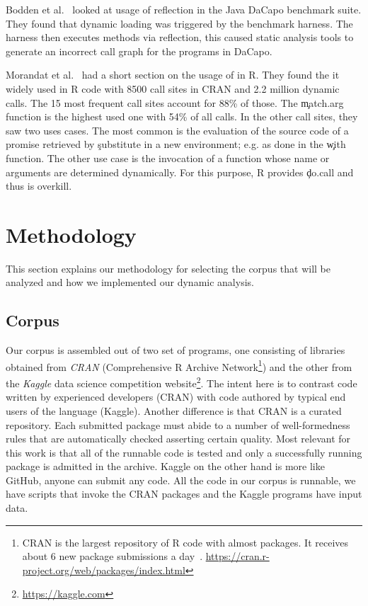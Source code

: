 \documentclass[acmsmall]{acmart}
\begin{document}
Bodden et al.~\cite{bodden} looked at usage of reflection in the Java
DaCapo benchmark suite. They found that dynamic loading was triggered
by the benchmark harness. The harness then executes methods via
reflection, this caused static analysis tools to generate an incorrect
call graph for the programs in DaCapo.

Morandat et al.~\cite{ecoop12} had a short section on the usage of
\eval in R. They found the it widely used in R code with 8500 call
sites in CRAN and 2.2 million dynamic calls. The 15 most frequent call
sites account for 88\% of those. The \c{match.arg} function is the
highest used one with 54\% of all calls. In the other call sites, they
saw two uses cases. The most common is the evaluation of the source
code of a promise retrieved by \c{substitute} in a new environment;
e.g. as done in the \c{with} function. The other use case is the
invocation of a function whose name or arguments are determined
dynamically. For this purpose, R provides \c{do.call} and thus \eval
is overkill.

\section{Methodology}

This section explains our methodology for selecting the corpus that
will be analyzed and how we implemented our dynamic analysis.

\subsection{Corpus}

Our corpus is assembled out of two set of programs, one consisting of libraries
obtained from \emph{CRAN} (Comprehensive R Archive Network\footnote{CRAN is the
  largest repository of R code with almost \CranAvailablePackagesRnd packages.
  It receives about 6 new package submissions a day~\cite{Ligges2017}. \cf
  \url{https://cran.r-project.org/web/packages/index.html}}) and the other from
the \emph{Kaggle} data science competition website\footnote{\cf
  \url{https://kaggle.com}}. The intent here is to contrast code written by
experienced developers (CRAN) with code authored by typical end users of the
language (Kaggle). Another difference is that CRAN is a curated repository. Each
submitted package must abide to a number of well-formedness rules that are
automatically checked asserting certain quality. Most relevant for this work is
that all of the runnable code is tested and only a successfully running package
is admitted in the archive. Kaggle on the other hand is more like GitHub, anyone
can submit any code. All the code in our corpus is runnable, \ie we have scripts
that invoke the CRAN packages and the Kaggle programs have input data.
\end{document}

